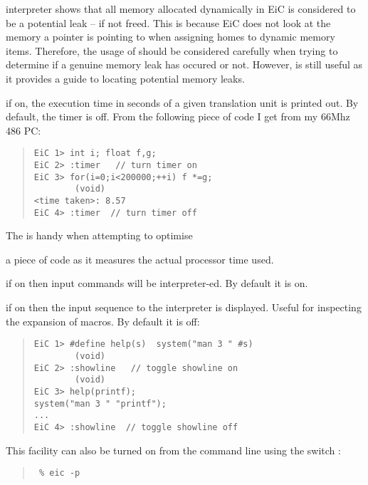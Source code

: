 \begin{Ventry} {interpreter}
shows that all memory allocated dynamically in EiC is considered to be a
potential leak -- if not freed. This is because EiC does not look at
the memory a pointer is pointing to when assigning homes to dynamic
memory items. Therefore, the usage of  should be considered
carefully when trying to determine if a  genuine memory leak has
occured or not. However,  is still useful as it  provides a
guide to locating potential memory leaks.

\item[timer]
\label{item:timer}  

if on, the execution time in seconds of a given translation unit is
printed out.  By default, the timer is off. From the following piece
of code I get from my 66Mhz 486 PC:
\begin{quote}
\begin{verbatim}
EiC 1> int i; float f,g;
EiC 2> :timer   // turn timer on
EiC 3> for(i=0;i<200000;++i) f *=g;
        (void)
<time taken>: 8.57
EiC 4> :timer  // turn timer off
\end{verbatim}
\end{quote} The  is handy when attempting to optimise  

a piece of code as it measures the actual processor time used.

\item[interpreter] \label{item:interpreter} 
         if on then input commands will be
         interpreter-ed. By default it is on.
\item[showline]
\label{item:showline} 

if on then the input sequence to the
interpreter is displayed. Useful for
inspecting the expansion of macros. 
By default it is off:

\begin{quote}
\begin{verbatim}
EiC 1> #define help(s)  system("man 3 " #s)
        (void)
EiC 2> :showline   // toggle showline on
        (void)
EiC 3> help(printf);       
system("man 3 " "printf");
...
EiC 4> :showline  // toggle showline off
\end{verbatim}
\end{quote}     
This facility can also be turned on from the command line using the
switch :
\begin{quote}
\begin{verbatim}
 % eic -p
\end{verbatim}
\end{quote}     



\end{Ventry}
